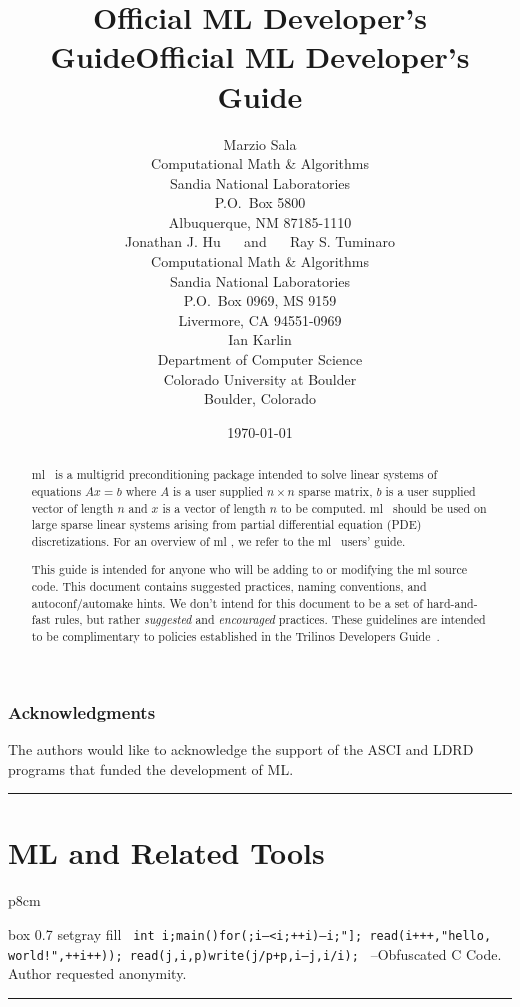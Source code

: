 \documentclass[10pt,letter,relax]{SANDreport}
\title{Official ML Developer's Guide}
\title{Official ML Developer's Guide}
\author{
Marzio  Sala \\
Computational Math \& Algorithms \\
Sandia National Laboratories\\
P.O.~Box 5800 \\
Albuquerque, NM 87185-1110\\[20pt]
Jonathan J. Hu $\quad$ and $\quad$
Ray S. Tuminaro \\
Computational Math \& Algorithms \\
Sandia National Laboratories\\
P.O.~Box 0969, MS 9159\\
Livermore, CA 94551-0969\\[20pt]
Ian Karlin \\
Department of Computer Science\\
Colorado University at Boulder \\
Boulder, Colorado
}
\date{\today}
\newcommand{\HRule}{\noindent\rule{\linewidth}{1mm}}
\newcommand{\ML}     {{\sc ml }}
\begin{document}
\maketitle

\begin{abstract}
\ML\ is a multigrid preconditioning package intended to solve linear systems
 of equations $A x = b$ where $A$ is a user supplied $n \times n$ sparse
matrix, $b$ is a user supplied vector of length $n$ and $x$ is a vector of
length $n$ to be computed. \ML\ should be used on large sparse linear
systems arising from partial differential equation (PDE) discretizations.
For an overview of \ML, we refer to the \ML\ users' guide.

This guide is intended for anyone who will be adding to or modifying the \ML
source code.  This document contains suggested practices, naming conventions,
and autoconf/automake hints.  We don't intend for this document to be a set
of hard-and-fast rules, but rather {\em suggested} and {\em encouraged}
practices. These guidelines are intended to be complimentary to policies
established in the Trilinos Developers Guide~\cite{Trilinos-Dev-Guide}.
\end{abstract}

\clearpage

\section*{Acknowledgments}
The authors would like to acknowledge the support of the ASCI and LDRD 
programs that funded the development of ML.

\clearpage

\SANDmain

\tableofcontents

\clearpage
\newpage


\vspace*{3cm}
\HRule
\part{ML and Related Tools}
\bigskip

\hfill
\begin{tabular}{p{8cm}}
\begin{boxitpara}{box 0.7 setgray fill}
{\tt
        int
        i;main(){for(;i--<i;++i){--i;}"]; read(i+++,"hello,
          world!",++i++));} read(j,i,p){write(j/p+p,i---j,i/i);}
}
--Obfuscated C Code. Author requested anonymity. 
\end{boxitpara}
\end{tabular}
\HRule
\end{document}
